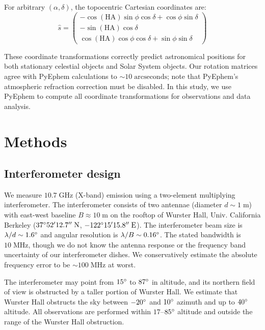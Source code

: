 \documentclass[10pt]{article}
\newcommand {\mt}{\mathrm}
\newcommand {\unit}[1]{\; \mt{#1}}
\begin{document}
For arbitrary $(\alpha, \delta)$, the topocentric Cartesian coordinates are:
\begin{equation}
	\hat{s} =
	\begin{pmatrix}
		-\cos(\mathrm{HA}) \sin\phi \cos\delta + \cos\phi \sin\delta \\
		-\sin(\mathrm{HA}) \cos\delta \\
		 \cos(\mathrm{HA}) \cos\phi \cos\delta + \sin\phi \sin\delta
	\end{pmatrix}
\end{equation}

These coordinate transformations correctly predict astronomical positions for both stationary celestial objects and Solar System objects.
Our rotation matrices agree with PyEphem calculations to $\sim 10 \unit{arcseconds}$; note that PyEphem's atmospheric refraction correction must be disabled.
In this study, we use PyEphem to compute all coordinate transformations for observations and data analysis.


\section{Methods}

\subsection{Interferometer design}

We measure $10.7 \unit{GHz}$ (X-band) emission using a two-element multiplying interferometer.
The interferometer consists of two antennae (diameter $d \sim 1 \unit{m}$) with east-west baseline $B \approx 10 \unit{m}$ on the rooftop of Wurster Hall, Univ. California Berkeley ($37\degree 52' 12.7'' \unit{N}$, $-122\degree 15' 15.8'' \unit{E}$).
The interferometer beam size is $\lambda/d \sim 1.6\degree$ and angular resolution is $\lambda / B \sim 0.16\degree$.
The stated bandwidth is $10 \unit{MHz}$, though we do not know the antenna response or the frequency band uncertainty of our interferometer dishes.
We conservatively estimate the absolute frequency error to be $\sim 100 \unit{MHz}$ at worst.

The interferometer may point from $15\degree$ to $87\degree$ in altitude, and its northern field of view is obstructed by a taller portion of Wurster Hall.
We estimate that Wurster Hall obstructs the sky between $-20\degree$ and $10\degree$ azimuth and up to $40\degree$ altitude.
All observations are performed within $17$--$85\degree$ altitude and outside the range of the Wurster Hall obstruction.
\end{document}
